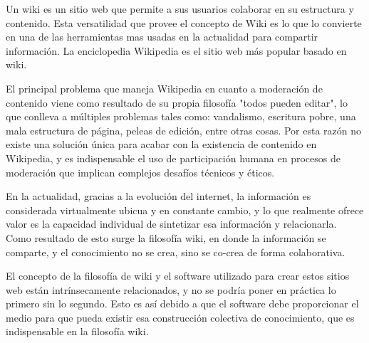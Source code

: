 

Un wiki es un sitio web que permite a sus usuarios colaborar en su estructura y contenido. Esta versatilidad que provee el concepto de Wiki es lo que lo convierte en una de las herramientas mas usadas en la actualidad para compartir información. La enciclopedia Wikipedia es el sitio web más popular basado en wiki.

El principal problema que maneja Wikipedia en cuanto a moderación de contenido viene como resultado de su propia filosofía "todos pueden editar", lo que conlleva a múltiples problemas tales como: vandalismo, escritura pobre, una mala estructura de página, peleas de edición, entre otras cosas. Por esta razón no existe una solución única para acabar con la existencia de  contenido en Wikipedia, y es indispensable el uso de participación humana en procesos de moderación que implican complejos desafíos técnicos y éticos.

En la actualidad, gracias a la evolución del internet,
la información es considerada virtualmente ubicua y en constante cambio,
y lo que realmente ofrece valor es la capacidad individual de sintetizar esa información y relacionarla.
Como resultado de esto surge la filosofía wiki, en donde la información se comparte, y el conocimiento no se crea, sino se co-crea de forma colaborativa.

El concepto de la filosofía de wiki y el software utilizado para crear estos sitios web están intrínsecamente relacionados, y no se podría poner en práctica lo primero sin lo segundo. Esto es así debido a que el software debe proporcionar el medio para que pueda existir esa construcción colectiva de conocimiento, que es indispensable en la filosofía wiki.



